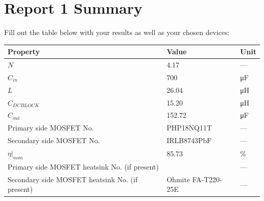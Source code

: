 \documentclass{PELsmallreport}
\begin{document}
\newpage
\section{Report 1 Summary}
Fill out the table below with your results as well as your chosen devices:

\begin{framed}
\begin{center}\captionsetup{type=table}
	\label{Tab:Specs_calculated}
    \begin{tabular}{|l|l|l|}
      \hline
      \textbf{Property} & \textbf{Value} & \textbf{Unit} \\
      \hline
        $N$            & 4.17 & ---               \\ \hline
        $C_{in}$       & 700 & \si{\micro\farad} \\ \hline
		$L$            & 26.04 & \si{\micro\henry} \\ \hline
		$C_{DCBLOCK}$  & 15.20 & \si{\micro\henry} \\ \hline        
		$C_{out}$ & 152.72 & \si{\micro\farad} \\ \hline
		Primary side MOSFET No.   & PHP18NQ11T & --- \\ \hline
		Secondary side MOSFET No. & IRLB8743PbF & --- \\ \hline
	   	$\left.\eta\right|_{nom}$ & 85.73 & \% \\ \hline
		Primary side MOSFET heatsink No. (if present)   &  & --- \\ \hline
		Secondary side MOSFET heatsink No. (if present) & Ohmite FA-T220-25E & --- \\ \hline
    \end{tabular}
\end{center}
\end{framed}
\hfill{}
\end{document}
